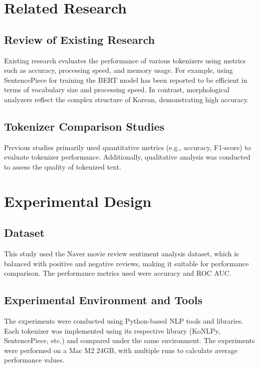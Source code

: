 \documentclass{article}
\begin{document}
\section{Related Research}

\subsection{Review of Existing Research}

Existing research evaluates the performance of various tokenizers using metrics such as accuracy, processing speed, and memory usage. For example, using SentencePiece for training the BERT model has been reported to be efficient in terms of vocabulary size and processing speed. In contrast, morphological analyzers reflect the complex structure of Korean, demonstrating high accuracy.

\subsection{Tokenizer Comparison Studies}

Previous studies primarily used quantitative metrics (e.g., accuracy, F1-score) to evaluate tokenizer performance. Additionally, qualitative analysis was conducted to assess the quality of tokenized text.

\section{Experimental Design}

\subsection{Dataset}

This study used the Naver movie review sentiment analysis dataset, which is balanced with positive and negative reviews, making it suitable for performance comparison. The performance metrics used were accuracy and ROC AUC.

\subsection{Experimental Environment and Tools}

The experiments were conducted using Python-based NLP tools and libraries. Each tokenizer was implemented using its respective library (KoNLPy, SentencePiece, etc.) and compared under the same environment. The experiments were performed on a Mac M2 24GB, with multiple runs to calculate average performance values.
\end{document}

